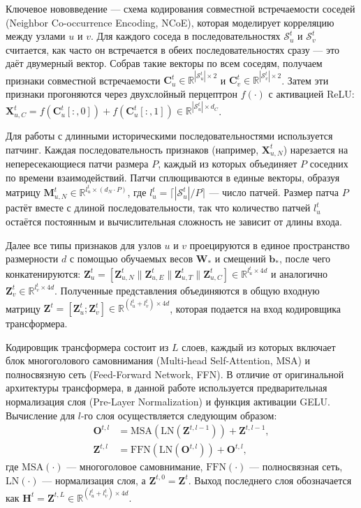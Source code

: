 \documentclass[a4paper,12pt]{extarticle}
\begin{document}
Ключевое нововведение --- схема кодирования совместной встречаемости соседей (Neighbor Co-occurrence Encoding, NCoE), которая моделирует корреляцию между узлами \(u\) и \(v\). Для каждого соседа в последовательностях \(\mathcal{S}_{u}^{t}\) и \(\mathcal{S}_{v}^{t}\) считается, как часто он встречается в обеих последовательностях сразу --- это даёт двумерный вектор. Собрав такие векторы по всем соседям, получаем признаки совместной встречаемости \(\mathbf{C}_{u}^{t} \in \mathbb{R}^{|\mathcal{S}_{u}^{t}| \times 2}\) и \(\mathbf{C}_{v}^{t} \in \mathbb{R}^{|\mathcal{S}_{v}^{t}| \times 2}\). Затем эти признаки прогоняются через двухслойный перцептрон \(f(\cdot)\) с активацией ReLU: \(\mathbf{X}_{u,C}^{t} = f(\mathbf{C}_{u}^{t}[:, 0]) + f(\mathbf{C}_{u}^{t}[:, 1]) \in \mathbb{R}^{|\mathcal{S}_{u}^{t}| \times d_C}\).

Для работы с длинными историческими последовательностями используется патчинг. Каждая последовательность признаков (например, \(\mathbf{X}_{u,N}^{t}\)) нарезается на непересекающиеся патчи размера \(P\), каждый из которых объединяет \(P\) соседних по времени взаимодействий. Патчи сплющиваются в единые векторы, образуя матрицу \(\mathbf{M}_{u,N}^{t} \in \mathbb{R}^{l_u^t \times (d_N \cdot P)}\), где \(l_u^t = \lceil |\mathcal{S}_{u}^{t}| / P \rceil\) --- число патчей. Размер патча \(P\) растёт вместе с длиной последовательности, так что количество патчей \(l_u^t\) остаётся постоянным и вычислительная сложность не зависит от длины входа.

Далее все типы признаков для узлов \(u\) и \(v\) проецируются в единое пространство размерности \(d\) с помощью обучаемых весов \(\mathbf{W}_*\) и смещений \(\mathbf{b}_*\), после чего конкатенируются: \(\mathbf{Z}_{u}^{t} = [\mathbf{Z}_{u,N}^{t} \| \mathbf{Z}_{u,E}^{t} \| \mathbf{Z}_{u,T}^{t} \| \mathbf{Z}_{u,C}^{t}] \in \mathbb{R}^{l_u^t \times 4d}\) и аналогично \(\mathbf{Z}_{v}^{t} \in \mathbb{R}^{l_v^t \times 4d}\). Полученные представления объединяются в общую входную матрицу \(\mathbf{Z}^{t} = [\mathbf{Z}_{u}^{t}; \mathbf{Z}_{v}^{t}] \in \mathbb{R}^{(l_u^t + l_v^t) \times 4d}\), которая подается на вход кодировщика трансформера.

Кодировщик трансформера состоит из \(L\) слоев, каждый из которых включает блок многоголового самовнимания (Multi-head Self-Attention, MSA) и полносвязную сеть (Feed-Forward Network, FFN). В отличие от оригинальной архитектуры трансформера, в данной работе используется предварительная нормализация слоя (Pre-Layer Normalization) и функция активации GELU. Вычисление для \(l\)-го слоя осуществляется следующим образом:
\[
\begin{aligned}
\mathbf{O}^{t,l} &= \text{MSA}(\text{LN}(\mathbf{Z}^{t,l-1})) + \mathbf{Z}^{t,l-1}, \\
\mathbf{Z}^{t,l} &= \text{FFN}(\text{LN}(\mathbf{O}^{t,l})) + \mathbf{O}^{t,l},
\end{aligned}
\]
где \(\text{MSA}(\cdot)\) — многоголовое самовнимание, \(\text{FFN}(\cdot)\) — полносвязная сеть, \(\text{LN}(\cdot)\) — нормализация слоя, а \(\mathbf{Z}^{t,0} = \mathbf{Z}^{t}\). Выход последнего слоя обозначается как \(\mathbf{H}^{t} = \mathbf{Z}^{t,L} \in \mathbb{R}^{(l_u^t + l_v^t) \times 4d}\).
\end{document}
